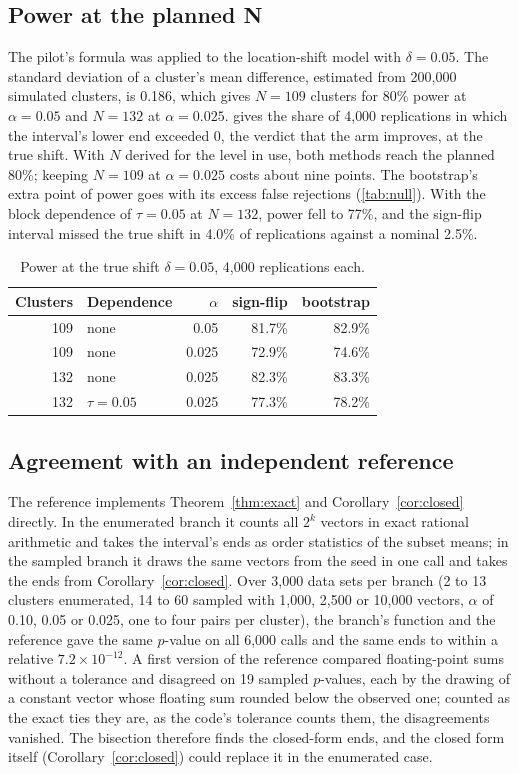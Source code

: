 \documentclass[11pt]{article}
\theoremstyle{plain}
\theoremstyle{definition}
\theoremstyle{remark}
\begin{document}
\subsection{Power at the planned N}
The pilot's formula was applied to the location-shift model with $\delta = 0.05$. The standard
deviation of a cluster's mean difference, estimated from 200{,}000 simulated clusters, is 0.186,
which gives $N = 109$ clusters for 80\% power at $\alpha = 0.05$ and $N = 132$ at $\alpha = 0.025$.
 gives the share of 4{,}000 replications in which the interval's lower end exceeded
0, the verdict that the arm improves, at the true shift. With $N$ derived for the level in use,
both methods reach the planned 80\%; keeping $N = 109$ at $\alpha = 0.025$ costs about nine points.
The bootstrap's extra point of power goes with its excess false rejections (\cref{tab:null}). With
the block dependence of $\tau = 0.05$ at $N = 132$, power fell to 77\%, and the sign-flip interval
missed the true shift in 4.0\% of replications against a nominal 2.5\%.

\begin{table}[ht]
\centering\small
\caption{Power at the true shift $\delta = 0.05$, 4{,}000 replications each.}\label{tab:power}
\begin{tabular}{@{}rlrrr@{}}
\toprule
Clusters & Dependence & $\alpha$ & sign-flip & bootstrap \\
\midrule
109 & none & 0.05 & 81.7\% & 82.9\% \\
109 & none & 0.025 & 72.9\% & 74.6\% \\
132 & none & 0.025 & 82.3\% & 83.3\% \\
132 & $\tau = 0.05$ & 0.025 & 77.3\% & 78.2\% \\
\bottomrule
\end{tabular}
\end{table}

\subsection{Agreement with an independent reference}
The reference implements Theorem~\ref{thm:exact} and Corollary~\ref{cor:closed} directly. In the enumerated branch it counts
all $2^k$ vectors in exact rational arithmetic and takes the interval's ends as order statistics of
the subset means; in the sampled branch it draws the same vectors from the seed in one call and
takes the ends from Corollary~\ref{cor:closed}. Over 3{,}000 data sets per branch (2 to 13 clusters
enumerated, 14 to 60 sampled with 1{,}000, 2{,}500 or 10{,}000 vectors, $\alpha$ of 0.10, 0.05 or
0.025, one to four pairs per cluster), the branch's function and the reference gave the same
$p$-value on all 6{,}000 calls and the same ends to within a relative $7.2 \times 10^{-12}$. A first
version of the reference compared floating-point sums without a tolerance and disagreed on 19
sampled $p$-values, each by the drawing of a constant vector whose floating sum rounded below the
observed one; counted as the exact ties they are, as the code's tolerance counts them, the
disagreements vanished. The bisection therefore finds the closed-form ends, and the closed form
itself (Corollary~\ref{cor:closed}) could replace it in the enumerated case.
\end{document}
